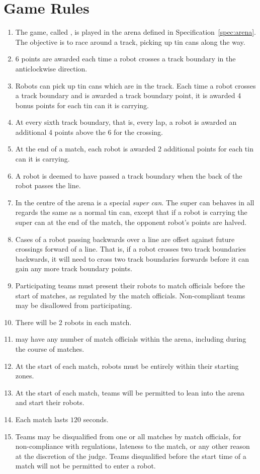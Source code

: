 \section{Game Rules}
\label{sec:rules}

\begin{enumerate}
  \item The game, called \emph{\gamename}, is played in the arena defined in
        Specification~\ref{spec:arena}. The objective is to race around a
        track, picking up tin cans along the way.
  \item 6 points are awarded each time a robot crosses a track boundary in the
        anticlockwise direction.
  \item Robots can pick up tin cans which are in the track. Each time a robot
        crosses a track boundary and is awarded a track boundary point, it is
        awarded 4 bonus points for each tin can it is carrying.
  \item At every sixth track boundary, that is, every lap, a robot is awarded
        an additional 4 points above the 6 for the crossing.
  \item At the end of a match, each robot is awarded 2 additional points for
        each tin can it is carrying.
  \item A robot is deemed to have passed a track boundary when the back of the
        robot passes the line.
  \item In the centre of the arena is a special \emph{super can}. The super can
        behaves in all regards the same as a normal tin can, except that if a
        robot is carrying the super can at the end of the match, the opponent
        robot's points are halved.
  \item Cases of a robot passing backwards over a line are offset against
        future crossings forward of a line. That is, if a robot crosses two
        track boundaries backwards, it will need to cross two track boundaries
        forwards before it can gain any more track boundary points.
  \item Participating teams must present their robots to match officials before
        the start of matches, as regulated by the match officials. Non-compliant
        teams may be disallowed from participating.
  \item There will be 2 robots in each match.
  \item \org may have any number of match officials within the arena, including
        during the course of matches.
  \item At the start of each match, robots must be entirely within their
        starting zones.
  \item At the start of each match, teams will be permitted to lean into the
        arena and start their robots.
  \item Each match lasts $120$ seconds.
  \item Teams may be disqualified from one or all matches by match officials,
        for non-compliance with regulations, lateness to the match, or any other
        reason at the discretion of the judge. Teams disqualified before the
        start time of a match will not be permitted to enter a robot.
\end{enumerate}

